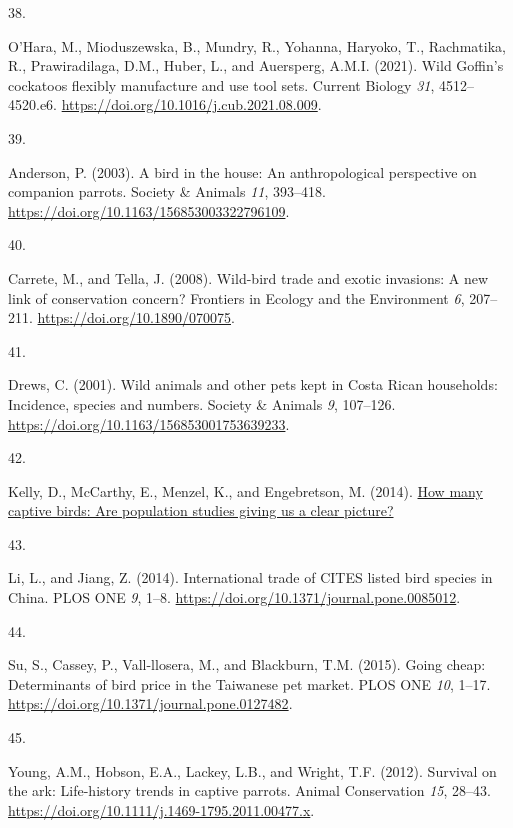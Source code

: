 \documentclass[
  man, donotrepeattitle,floatsintext]{apa6}
\newlength{\cslhangindent}
\newlength{\csllabelwidth}
\newlength{\cslentryspacingunit} %
\newenvironment{CSLReferences}[2] %
 {%
  \setlength{\parindent}{0pt}
  \ifodd #1
  \let\oldpar\par
  \def\par{\hangindent=\cslhangindent\oldpar}
  \fi
  \setlength{\parskip}{#2\cslentryspacingunit}
 }%
 {}
\newcommand{\CSLLeftMargin}[1]{\parbox[t]{\csllabelwidth}{#1}}
\newcommand{\CSLRightInline}[1]{\parbox[t]{\linewidth - \csllabelwidth}{#1}\break}
\begin{document}
\begin{CSLReferences}{0}{0}
\leavevmode{}%
\CSLLeftMargin{38. }%
\CSLRightInline{O'Hara, M., Mioduszewska, B., Mundry, R., Yohanna, Haryoko, T., Rachmatika, R., Prawiradilaga, D.M., Huber, L., and Auersperg, A.M.I. (2021). Wild {G}offin's cockatoos flexibly manufacture and use tool sets. Current Biology \emph{31}, 4512--4520.e6. \url{https://doi.org/10.1016/j.cub.2021.08.009}.}

\leavevmode{}%
\CSLLeftMargin{39. }%
\CSLRightInline{Anderson, P. (2003). A bird in the house: An anthropological perspective on companion parrots. Society \& Animals \emph{11}, 393--418. \url{https://doi.org/10.1163/156853003322796109}.}

\leavevmode{}%
\CSLLeftMargin{40. }%
\CSLRightInline{Carrete, M., and Tella, J. (2008). Wild-bird trade and exotic invasions: A new link of conservation concern? Frontiers in Ecology and the Environment \emph{6}, 207--211. \url{https://doi.org/10.1890/070075}.}

\leavevmode{}%
\CSLLeftMargin{41. }%
\CSLRightInline{Drews, C. (2001). Wild animals and other pets kept in {C}osta {R}ican households: Incidence, species and numbers. Society \& Animals \emph{9}, 107--126. \url{https://doi.org/10.1163/156853001753639233}.}

\leavevmode{}%
\CSLLeftMargin{42. }%
\CSLRightInline{Kelly, D., McCarthy, E., Menzel, K., and Engebretson, M. (2014). \href{https://www.avianwelfare.org/issues/overview.htm}{How many captive birds: Are population studies giving us a clear picture?}}

\leavevmode{}%
\CSLLeftMargin{43. }%
\CSLRightInline{Li, L., and Jiang, Z. (2014). International trade of {CITES} listed bird species in {C}hina. PLOS ONE \emph{9}, 1--8. \url{https://doi.org/10.1371/journal.pone.0085012}.}

\leavevmode{}%
\CSLLeftMargin{44. }%
\CSLRightInline{Su, S., Cassey, P., Vall-llosera, M., and Blackburn, T.M. (2015). Going cheap: Determinants of bird price in the {T}aiwanese pet market. PLOS ONE \emph{10}, 1--17. \url{https://doi.org/10.1371/journal.pone.0127482}.}

\leavevmode{}%
\CSLLeftMargin{45. }%
\CSLRightInline{Young, A.M., Hobson, E.A., Lackey, L.B., and Wright, T.F. (2012). Survival on the ark: Life-history trends in captive parrots. Animal Conservation \emph{15}, 28--43. \url{https://doi.org/10.1111/j.1469-1795.2011.00477.x}.}


\end{CSLReferences}
\end{document}
